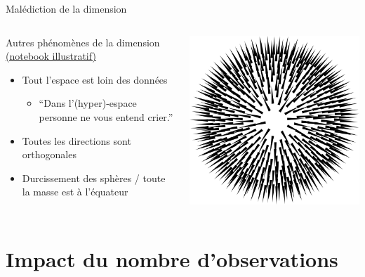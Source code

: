 \documentclass[presentation, aspectratio=169]{beamer}
\begin{document}
\begin{frame}[squeeze]{Malédiction de la dimension}
  \begin{columns}
    \begin{block}{Autres phénomènes de la dimension
        \href{https://github.com/alban-goupil/jc-fare-2025/blob/main/notebooks/4-dimension.ipynb}{(notebook
          illustratif)}}
      \begin{itemize}
      \item Tout l'espace est loin des données
        \begin{itemize}
        \item ``Dans l'(hyper)-espace personne ne vous entend crier.''
        \end{itemize}
      \item Toutes les directions sont orthogonales
      \item Durcissement des sphères / toute la masse est à l'équateur
      \end{itemize}
    \end{block}
    \includegraphics[width=\textwidth]{spiked-ball}
  \end{columns}
\end{frame}


\section{Impact du nombre d'observations}
\end{document}

